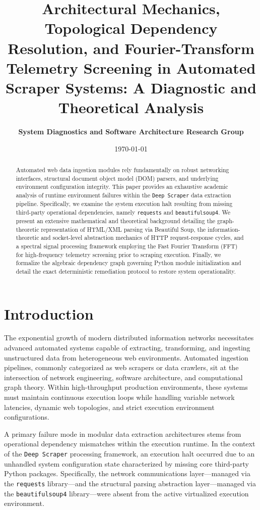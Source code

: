 \documentclass{article}
\title{\textbf{Architectural Mechanics, Topological Dependency Resolution, and Fourier-Transform Telemetry Screening in Automated Scraper Systems: A Diagnostic and Theoretical Analysis}}
\author{\textbf{System Diagnostics and Software Architecture Research Group}}
\date{\today}
\begin{document}
\maketitle

\begin{abstract}
Automated web data ingestion modules rely fundamentally on robust networking interfaces, structural document object model (DOM) parsers, and underlying environment configuration integrity. This paper provides an exhaustive academic analysis of runtime environment failures within the \texttt{Deep Scraper} data extraction pipeline. Specifically, we examine the system execution halt resulting from missing third-party operational dependencies, namely \texttt{requests} and \texttt{beautifulsoup4}. We present an extensive mathematical and theoretical background detailing the graph-theoretic representation of HTML/XML parsing via Beautiful Soup, the information-theoretic and socket-level abstraction mechanics of HTTP request-response cycles, and a spectral signal processing framework employing the Fast Fourier Transform (FFT) for high-frequency telemetry screening prior to scraping execution. Finally, we formalize the algebraic dependency graph governing Python module initialization and detail the exact deterministic remediation protocol to restore system operationality.
\end{abstract}

\section{Introduction}

The exponential growth of modern distributed information networks necessitates advanced automated systems capable of extracting, transforming, and ingesting unstructured data from heterogeneous web environments. Automated ingestion pipelines, commonly categorized as web scrapers or data crawlers, sit at the intersection of network engineering, software architecture, and computational graph theory. Within high-throughput production environments, these systems must maintain continuous execution loops while handling variable network latencies, dynamic web topologies, and strict execution environment configurations.

A primary failure mode in modular data extraction architectures stems from operational dependency mismatches within the execution runtime. In the context of the \texttt{Deep Scraper} processing framework, an execution halt occurred due to an unhandled system configuration state characterized by missing core third-party Python packages. Specifically, the network communications layer—managed via the \texttt{requests} library—and the structural parsing abstraction layer—managed via the \texttt{beautifulsoup4} library—were absent from the active virtualized execution environment.
\end{document}
